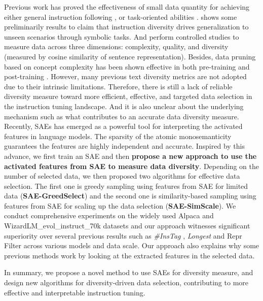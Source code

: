 Previous work has proved the effectiveness of small data quantity for achieving either general instruction following \citep{chen2023maybe, zhou2024lima}, or task-oriented abilities \citep{xialess}. \cite{zhang2024instruction} shows some preliminarily results to claim that instruction diversity drives generalization to unseen scenarios through symbolic tasks. And \cite{liumakes} perform controlled studies to measure data across
three dimensions: complexity, quality, and diversity (measured by cosine similarity of sentence representation). Besides, data pruning based on concept complexity has been shown effective in both pre-training \citep{abbaseffective} and post-training \citep{lu2023instag}.
However, many previous text diversity metrics \citep{shaib2024standardizing} are not adopted due to their intrinsic limitations. Therefore, there is still a lack of reliable diversity measure toward more efficient, effective, and targeted data selection in the instruction tuning landscape. And it is also unclear about the underlying mechanism such as what contributes to an accurate data diversity measure. 
Recently, SAEs \citep{cunningham2023sparse} has emerged as a powerful tool for interpreting the activated features in language models. The sparsity of the atomic monosemanticity guarantees the features are highly independent and 
accurate. Inspired by this advance, we first train an SAE and then \textbf{propose a new approach to use the activated features from SAE to measure data diversity}. 
Depending on the number of selected data, we then proposed two algorithms for effective data selection. The first one is greedy sampling using features from SAE for limited data (\textbf{SAE-GreedSelect}) and the second one is similarity-based sampling using features from SAE for scaling up the data selection (\textbf{SAE-SimScale}). We conduct comprehensive experiments on the widely used Alpaca \citep{taori2023alpaca} and WizardLM\_evol\_instruct\_70k \citep{xu2023wizardlm} datasets and our approach witnesses significant superiority over several previous results such as \textit{\#InsTag} \citep{lu2023instag}, \textit{Longest} \citep{zhaolong} and Repr Filter \citep{liumakes} across various models and data scale. 
Our approach also explains why some previous methods work by looking at the extracted features in the selected data.

In summary, we propose a novel method to use SAEs for diversity measure, and design new algorithms for diversity-driven data selection, contributing to more effective and interpretable instruction tuning.
